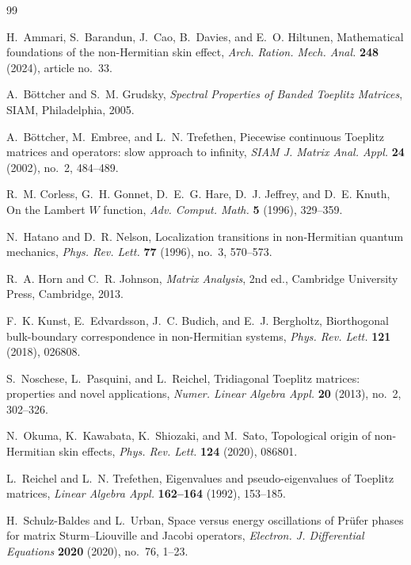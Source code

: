 \documentclass[11pt]{amsart}
\numberwithin{equation}{section}
\begin{document}
\begin{thebibliography}{99}

H.~Ammari, S.~Barandun, J.~Cao, B.~Davies, and E.~O. Hiltunen,
Mathematical foundations of the non-Hermitian skin effect,
\emph{Arch. Ration. Mech. Anal.} \textbf{248} (2024), article no.~33.

A.~B\"ottcher and S.~M. Grudsky,
\emph{Spectral Properties of Banded Toeplitz Matrices},
SIAM, Philadelphia, 2005.

A.~B\"ottcher, M.~Embree, and L.~N. Trefethen,
Piecewise continuous Toeplitz matrices and operators: slow approach to infinity,
\emph{SIAM J. Matrix Anal. Appl.} \textbf{24} (2002), no.~2, 484--489.

R.~M. Corless, G.~H. Gonnet, D.~E.~G. Hare, D.~J. Jeffrey, and D.~E. Knuth,
On the Lambert \(W\) function,
\emph{Adv. Comput. Math.} \textbf{5} (1996), 329--359.

N.~Hatano and D.~R. Nelson,
Localization transitions in non-Hermitian quantum mechanics,
\emph{Phys. Rev. Lett.} \textbf{77} (1996), no.~3, 570--573.

R.~A. Horn and C.~R. Johnson,
\emph{Matrix Analysis},
2nd ed.,
Cambridge University Press, Cambridge, 2013.

F.~K. Kunst, E.~Edvardsson, J.~C. Budich, and E.~J. Bergholtz,
Biorthogonal bulk-boundary correspondence in non-Hermitian systems,
\emph{Phys. Rev. Lett.} \textbf{121} (2018), 026808.

S.~Noschese, L.~Pasquini, and L.~Reichel,
Tridiagonal Toeplitz matrices: properties and novel applications,
\emph{Numer. Linear Algebra Appl.} \textbf{20} (2013), no.~2, 302--326.

N.~Okuma, K.~Kawabata, K.~Shiozaki, and M.~Sato,
Topological origin of non-Hermitian skin effects,
\emph{Phys. Rev. Lett.} \textbf{124} (2020), 086801.

L.~Reichel and L.~N. Trefethen,
Eigenvalues and pseudo-eigenvalues of Toeplitz matrices,
\emph{Linear Algebra Appl.} \textbf{162--164} (1992), 153--185.

H.~Schulz-Baldes and L.~Urban,
Space versus energy oscillations of Pr\"ufer phases for matrix Sturm--Liouville and Jacobi operators,
\emph{Electron. J. Differential Equations} \textbf{2020} (2020), no.~76, 1--23.


\end{thebibliography}
\end{document}
